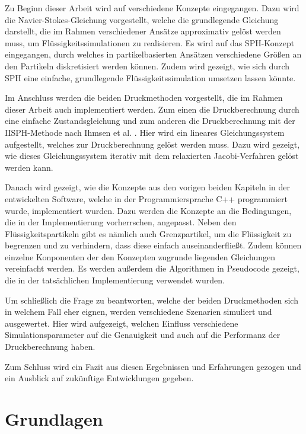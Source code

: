 \documentclass[11pt,
a4paper,
parskip=half, %
BCOR=10mm, %
english,
ngerman]{scrreprt}
\begin{document}
Zu Beginn dieser Arbeit wird auf verschiedene Konzepte eingegangen.
Dazu wird die Navier-Stokes-Gleichung vorgestellt, welche die grundlegende Gleichung darstellt,
die im Rahmen verschiedener Ansätze approximativ gelöst werden muss, um Flüssigkeitssimulationen zu realisieren.
Es wird auf das SPH-Konzept eingegangen, durch welches in partikelbasierten Ansätzen verschiedene Größen an den Partikeln diskretisiert werden können.
Zudem wird gezeigt, wie sich durch SPH eine einfache, grundlegende Flüssigkeitssimulation umsetzen lassen könnte.

Im Anschluss werden die beiden Druckmethoden vorgestellt, die im Rahmen dieser Arbeit auch implementiert werden.
Zum einen die Druckberechnung durch eine einfache Zustandsgleichung
und zum anderen die Druckberechnung mit der IISPH-Methode nach Ihmsen et al. \cite{ihmsen_implicit_2014}.
Hier wird ein lineares Gleichungssystem aufgestellt, welches zur Druckberechnung gelöst werden muss.
Dazu wird gezeigt, wie dieses Gleichungssystem iterativ mit dem relaxierten Jacobi-Verfahren gelöst werden kann.

Danach wird gezeigt, wie die Konzepte aus den vorigen beiden Kapiteln in der entwickelten Software, welche in der Programmiersprache C++ programmiert wurde,
implementiert wurden. Dazu werden die Konzepte an die Bedingungen, die in der Implementierung vorherrschen, angepasst.
Neben den Flüssigkeitspartikeln gibt es nämlich auch Grenzpartikel, um die Flüssigkeit zu begrenzen und zu verhindern, dass diese einfach auseinanderfließt.
Zudem können einzelne Konponenten der den Konzepten zugrunde liegenden Gleichungen vereinfacht werden.
Es werden außerdem die Algorithmen in Pseudocode gezeigt, die in der tatsächlichen Implementierung verwendet wurden.

Um schließlich die Frage zu beantworten, welche der beiden Druckmethoden sich in welchem Fall eher eignen, werden verschiedene Szenarien simuliert und ausgewertet.
Hier wird aufgezeigt, welchen Einfluss verschiedene Simulationsparameter auf die Genauigkeit und auch auf die Performanz der Druckberechnung haben.

Zum Schluss wird ein Fazit aus diesen Ergebnissen und Erfahrungen gezogen und ein Ausblick auf zukünftige Entwicklungen gegeben.


\chapter{Grundlagen}
\end{document}
